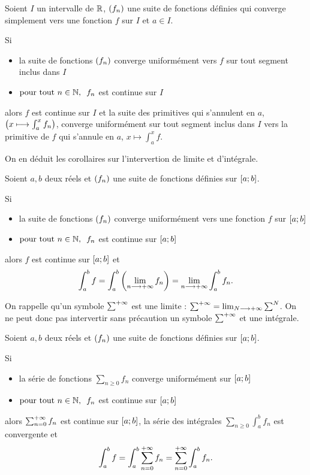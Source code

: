 \begin{theo}
Soient \(I\) un intervalle de \(\mathbb{R}\), \(\left(f_n\right)\) une suite de fonctions définies qui converge simplement vers une fonction \(f\) sur \(I\) et \(a\in I\).

Si

\begin{itemize}
    \item la suite de fonctions \(\left(f_n\right)\) converge uniformément vers \(f\) sur tout segment inclus dans \(I\) \\
    \item \(\quantifs{\tpt n\in\N}f_n\) est continue sur \(I\)
\end{itemize}

alors \(f\) est continue sur \(I\) et la suite des primitives qui s'annulent en \(a\), \ie \(\left(x\longmapsto\int_a^xf_n\right)\), converge uniformément sur tout segment inclus dans \(I\) vers la primitive de \(f\) qui s'annule en \(a\), \ie \(x\mapsto\int_a^xf\).
\end{theo}

On en déduit les corollaires sur l'intervertion de limite et d'intégrale.

\begin{cor}
Soient \(a,b\) deux réels et \(\left(f_n\right)\) une suite de fonctions définies sur \(\left[a;b\right]\).

Si

\begin{itemize}
    \item la suite de fonctions \(\left(f_n\right)\) converge uniformément vers une fonction \(f\) sur \(\left[a;b\right]\) \\
    \item \(\quantifs{\tpt n\in\N}f_n\) est continue sur \(\left[a;b\right]\)
\end{itemize}

alors \(f\) est continue sur \(\left[a;b\right]\) et \[\int_a^bf=\int_a^b\left(\lim_{n\longrightarrow+\infty}f_n\right)=\lim_{n\longrightarrow+\infty}\int_a^bf_n.\]
\end{cor}

On rappelle qu'un symbole \(\sum^{+\infty}\) est une limite : \(\sum^{+\infty}=\lim_{N\longrightarrow+\infty}\sum^N\). On ne peut donc pas intervertir sans précaution un symbole \(\sum^{+\infty}\) et une intégrale.

\begin{cor}
Soient \(a,b\) deux réels et \(\left(f_n\right)\) une suite de fonctions définies sur \(\left[a;b\right]\).

Si

\begin{itemize}
    \item la série de fonctions \(\sum_{n\geq0}f_n\) converge uniformément sur \(\left[a;b\right]\) \\
    \item \(\quantifs{\tpt n\in\N}f_n\) est continue sur \(\left[a;b\right]\)
\end{itemize}

alors \(\sum_{n=0}^{+\infty}f_n\) est continue sur \(\left[a;b\right]\), la série des intégrales \(\sum_{n\geq0}\int_a^bf_n\) est convergente et \[\int_a^bf=\int_a^b\sum_{n=0}^{+\infty}f_n=\sum_{n=0}^{+\infty}\int_a^bf_n.\]
\end{cor}

